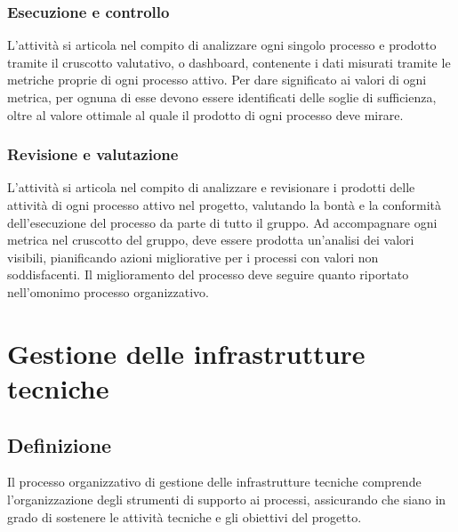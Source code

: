 \subsubsection{Esecuzione e controllo}
L'attività si articola nel compito di analizzare ogni singolo processo e prodotto tramite il cruscotto valutativo, o dashboard, contenente i dati misurati tramite le metriche proprie di ogni processo attivo. Per dare significato ai valori di ogni metrica, per ognuna di esse devono essere identificati delle soglie di sufficienza, oltre al valore ottimale al quale il prodotto di ogni processo deve mirare.

\subsubsection{Revisione e valutazione}
L'attività si articola nel compito di analizzare e revisionare i prodotti delle attività di ogni processo attivo nel progetto, valutando la bontà e la conformità dell'esecuzione del processo da parte di tutto il gruppo. Ad accompagnare ogni metrica nel cruscotto del gruppo, deve essere prodotta un'analisi dei valori visibili, pianificando azioni migliorative per i processi con valori non soddisfacenti. Il miglioramento del processo deve seguire quanto riportato nell'omonimo processo organizzativo.

\newpage

\section{Gestione delle infrastrutture tecniche} \label{sec:gestioinfr}
\subsection{Definizione}
Il processo organizzativo di gestione delle infrastrutture tecniche comprende l'organizzazione degli strumenti di supporto ai processi, assicurando che siano in grado di sostenere le attività tecniche e gli obiettivi del progetto.
